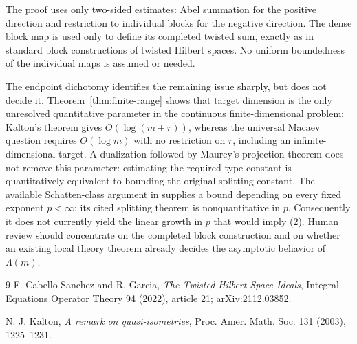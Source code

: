 \documentclass[11pt]{article}
\begin{document}
The proof uses only two-sided estimates: Abel summation for the positive
direction and restriction to individual blocks for the negative direction.
The dense block map is used only to define its completed twisted sum, exactly
as in standard block constructions of twisted Hilbert spaces. No uniform
boundedness of the individual maps is assumed or needed.

The endpoint dichotomy identifies the remaining issue sharply, but does not
decide it.  Theorem~\ref{thm:finite-range} shows that target dimension is the
only unresolved quantitative parameter in the continuous finite-dimensional
problem: Kalton's theorem gives $O(\log(m+r))$, whereas the universal Macaev
question requires $O(\log m)$ with no restriction on $r$, including an
infinite-dimensional target.  A dualization followed by Maurey's projection
theorem does not remove this parameter: estimating the required type constant
is quantitatively equivalent to bounding the original splitting constant.
The available Schatten-class argument in \cite{CG} supplies a bound depending
on every fixed exponent $p<\infty$; its cited splitting theorem is
nonquantitative in $p$. Consequently it does not currently yield the linear
growth in $p$ that would imply (2). Human review should concentrate on the
completed block construction and on whether an existing local theory theorem
already decides the asymptotic behavior of $\Lambda(m)$.

\begin{thebibliography}{9}
F. Cabello Sanchez and R. Garcia,
\emph{The Twisted Hilbert Space Ideals},
Integral Equations Operator Theory 94 (2022), article 21;
arXiv:2112.03852.

N. J. Kalton,
\emph{A remark on quasi-isometries},
Proc. Amer. Math. Soc. 131 (2003), 1225--1231.
\end{thebibliography}
\end{document}
